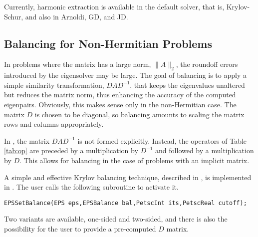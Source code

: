 Currently, harmonic extraction is available in the default  solver, that is, Krylov-Schur, and also in Arnoldi, GD, and JD.

\subsection{Balancing for Non-Hermitian Problems}
\label{sec:balancing}

In problems where the matrix has a large norm, $\|A\|_2$, the roundoff errors introduced by the eigensolver may be large. The goal of balancing is to apply a simple similarity transformation, $DAD^{-1}$, that keeps the eigenvalues unaltered but reduces the matrix norm, thus enhancing the accuracy of the computed eigenpairs. Obviously, this makes sense only in the non-Hermitian case. The matrix $D$ is chosen to be diagonal, so balancing amounts to scaling the matrix rows and columns appropriately.

In \slepc, the matrix $DAD^{-1}$ is not formed explicitly. Instead, the operators of Table \ref{tab:op} are preceded by a multiplication by $D^{-1}$ and followed by a multiplication by $D$. This allows for balancing in the case of problems with an implicit matrix.

A simple and effective Krylov balancing technique, described in \citep{Chen:2000:BSM}, is implemented in \slepc. The user calls the following subroutine to activate it.
        \begin{Verbatim}[fontsize=\small]
        EPSSetBalance(EPS eps,EPSBalance bal,PetscInt its,PetscReal cutoff);
        \end{Verbatim}
Two variants are available, one-sided and two-sided, and there is also the possibility for the user to provide a pre-computed $D$ matrix.
